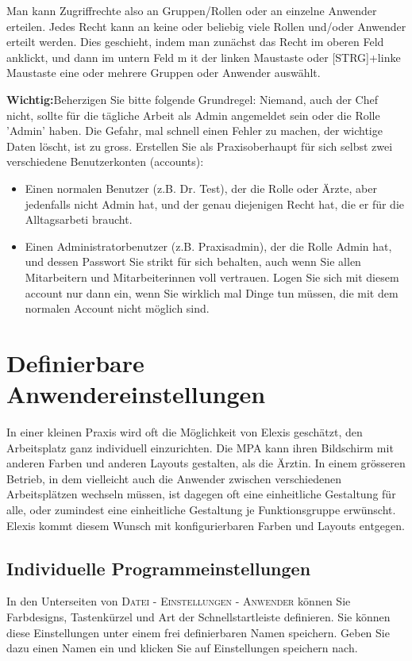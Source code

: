 Man kann Zugriffrechte also an Gruppen/Rollen oder an einzelne Anwender erteilen. Jedes
Recht kann an keine oder beliebig viele Rollen und/oder Anwender erteilt
werden. Dies geschieht, indem man zunächst das Recht im oberen Feld anklickt,
und dann im untern Feld m it der linken Maustaste oder [STRG]+linke Maustaste
eine oder mehrere Gruppen oder Anwender auswählt.

\textbf{Wichtig:}Beherzigen Sie bitte folgende Grundregel: Niemand, auch der
Chef nicht, sollte für die tägliche Arbeit als
Admin angemeldet sein oder die Rolle 'Admin' haben. Die Gefahr, mal schnell einen Fehler zu machen, der
wichtige Daten löscht, ist zu gross. Erstellen Sie als Praxisoberhaupt für sich
selbst zwei verschiedene Benutzerkonten (accounts):
\begin{itemize}
  \item Einen normalen Benutzer (z.B. Dr. Test), der die Rolle oder
  Ärzte, aber jedenfalls nicht Admin hat, und der genau diejenigen Recht
   hat, die er für die Alltagsarbeti braucht.
  \item Einen Administratorbenutzer (z.B. Praxisadmin), der die Rolle Admin
  hat, und dessen Passwort Sie strikt für sich behalten, auch wenn Sie
  allen Mitarbeitern und Mitarbeiterinnen voll vertrauen. Logen Sie sich mit
  diesem account nur dann ein, wenn Sie wirklich mal Dinge tun müssen, die mit
  dem normalen Account nicht möglich sind.
\end{itemize}

\section{Definierbare Anwendereinstellungen}
In einer kleinen Praxis wird oft die Möglichkeit von Elexis geschätzt, den
Arbeitsplatz ganz individuell einzurichten. Die MPA kann ihren Bildschirm mit
anderen Farben und anderen Layouts gestalten, als die Ärztin.
In einem grösseren Betrieb, in dem vielleicht auch die Anwender zwischen
verschiedenen Arbeitsplätzen wechseln müssen, ist dagegen oft eine einheitliche
Gestaltung für alle, oder zumindest eine einheitliche Gestaltung je
Funktionsgruppe erwünscht. Elexis kommt diesem Wunsch mit konfigurierbaren
Farben und Layouts entgegen.

\subsection{Individuelle Programmeinstellungen}
In den Unterseiten von \textsc{Datei - Einstellungen - Anwender} können Sie
Farbdesigns, Tastenkürzel und Art der Schnellstartleiste definieren. Sie können
diese Einstellungen unter einem frei definierbaren Namen speichern. Geben Sie
dazu einen Namen ein und klicken Sie auf \glqq Einstellungen speichern
nach\grqq{}.


